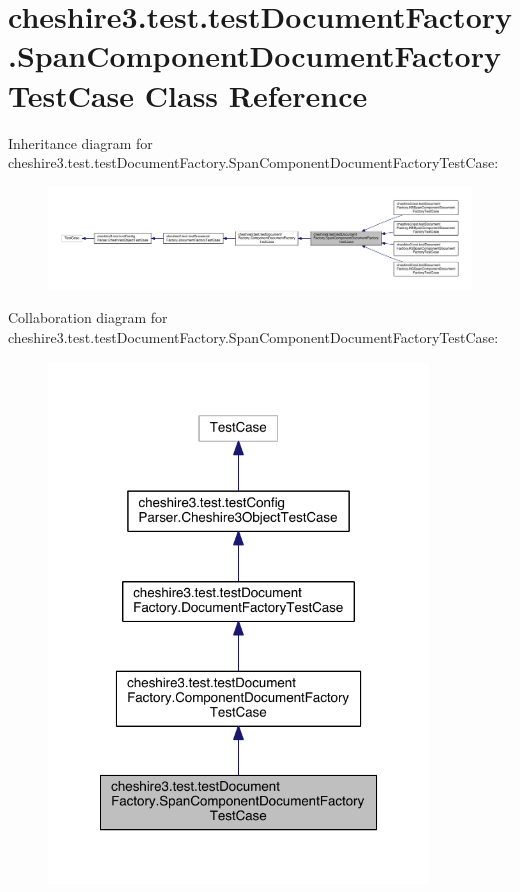 \hypertarget{classcheshire3_1_1test_1_1test_document_factory_1_1_span_component_document_factory_test_case}{\section{cheshire3.\-test.\-test\-Document\-Factory.\-Span\-Component\-Document\-Factory\-Test\-Case Class Reference}
\label{classcheshire3_1_1test_1_1test_document_factory_1_1_span_component_document_factory_test_case}
}


Inheritance diagram for cheshire3.\-test.\-test\-Document\-Factory.\-Span\-Component\-Document\-Factory\-Test\-Case\-:
\nopagebreak
\begin{figure}[H]
\begin{center}
\leavevmode
\includegraphics[width=350pt]{classcheshire3_1_1test_1_1test_document_factory_1_1_span_component_document_factory_test_case__inherit__graph}
\end{center}
\end{figure}


Collaboration diagram for cheshire3.\-test.\-test\-Document\-Factory.\-Span\-Component\-Document\-Factory\-Test\-Case\-:
\nopagebreak
\begin{figure}[H]
\begin{center}
\leavevmode
\includegraphics[width=286pt]{classcheshire3_1_1test_1_1test_document_factory_1_1_span_component_document_factory_test_case__coll__graph}
\end{center}
\end{figure}
